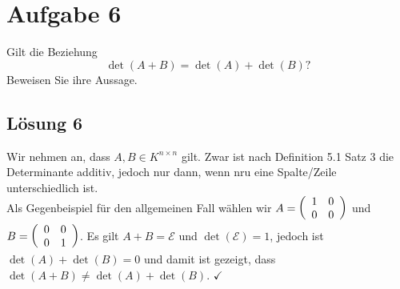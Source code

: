 \documentclass[main.tex]{subfiles}
\begin{document}
\section{Aufgabe 6}
Gilt die Beziehung
$$
    \det (A+B) = \det(A) + \det(B) \text{?}
$$
Beweisen Sie ihre Aussage.

\subsection{Lösung 6}
Wir nehmen an, dass $A,B \in K^{n\times n}$ gilt. Zwar ist nach Definition 5.1 Satz 3 die Determinante additiv, jedoch nur dann, wenn nru eine Spalte/Zeile unterschiedlich ist.\\

Als Gegenbeispiel für den allgemeinen Fall wählen wir $A = \eqmatrix{cc}{1 & 0\\ 0 & 0}$ und $B = \eqmatrix{cc}{0 & 0\\ 0 & 1}$. Es gilt $A+B = \mathcal{E}$ und $\det(\mathcal{E}) = 1$, jedoch ist $\det (A) + \det (B) = 0$ und damit ist gezeigt, dass $\det(A+B) \neq \det(A) + \det(B)$. $\checkmark$
\end{document}
